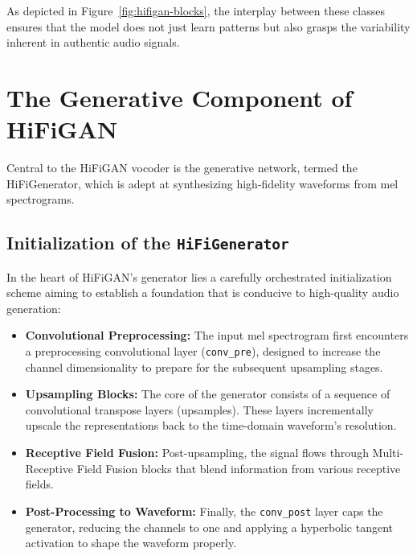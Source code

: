 \documentclass[a4paper]{article}
\begin{document}
As depicted in Figure~\ref{fig:hifigan-blocks}, the interplay between these classes ensures that the model does not just learn patterns but also grasps the variability inherent in authentic audio signals.



\section{The Generative Component of HiFiGAN}

Central to the HiFiGAN vocoder is the generative network, termed the HiFiGenerator, which is adept at synthesizing high-fidelity waveforms from mel spectrograms.

\subsection{Initialization of the \texttt{HiFiGenerator}}

In the heart of HiFiGAN's generator lies a carefully orchestrated initialization scheme aiming to establish a foundation that is conducive to high-quality audio generation:

\begin{itemize}
  \item \textbf{Convolutional Preprocessing:} The input mel spectrogram first encounters a preprocessing convolutional layer (\verb|conv_pre|), designed to increase the channel dimensionality to prepare for the subsequent upsampling stages.
  
  \item \textbf{Upsampling Blocks:} The core of the generator consists of a sequence of convolutional transpose layers (upsamples). These layers incrementally upscale the representations back to the time-domain waveform's resolution.
  
  \item \textbf{Receptive Field Fusion:} Post-upsampling, the signal flows through Multi-Receptive Field Fusion blocks that blend information from various receptive fields.
  
  \item \textbf{Post-Processing to Waveform:} Finally, the \verb|conv_post| layer caps the generator, reducing the channels to one and applying a hyperbolic tangent activation to shape the waveform properly.
\end{itemize}
\end{document}
